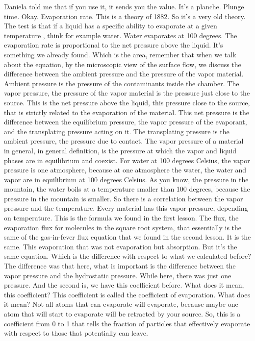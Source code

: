 Daniela told me that if you use it, it sends you the value. It's a planche. Plunge time. Okay. Evaporation rate. This is a theory of 1882. So it's a very old theory. The test is that if a liquid has a specific ability to evaporate at a given temperature , think for example water. Water evaporates at 100 degrees. The evaporation rate is proportional to the net pressure above the liquid. It's something we already found. Which is the area, remember that when we talk about the equation, by the microscopic view of the surface flow, we discuss the difference between the ambient pressure and the pressure of the vapor material. Ambient pressure is the pressure of the contaminants inside the chamber. The vapor pressure, the pressure of the vapor material is the pressure just close to the source. This is the net pressure above the liquid, this pressure close to the source, that is strictly related to the evaporation of the material. This net pressure is the difference between the equilibrium pressure, the vapor pressure of the evaporant, and the transplating pressure acting on it. The transplating pressure is the ambient pressure, the pressure due to contact. The vapor pressure of a material in general, in general definition, is the pressure at which the vapor and liquid phases are in equilibrium and coexist. For water at 100 degrees Celsius, the vapor pressure is one atmosphere, because at one atmosphere the water, the water and vapor are in equilibrium at 100 degrees Celsius. As you know, the pressure in the mountain, the water boils at a temperature smaller than 100 degrees, because the pressure in the mountain is smaller. So there is a correlation between the vapor pressure and the temperature. Every material has this vapor pressure, depending on temperature. This is the formula we found in the first lesson. The flux, the evaporation flux for molecules in the square root system, that essentially is the same of the gas-in-fever flux equation that we found in the second lesson. It is the same. This evaporation that was not evaporation but absorption. But it's the same equation. Which is the difference with respect to what we calculated before? The difference was that here, what is important is the difference between the vapor pressure and the hydrostatic pressure. While here, there was just one pressure. And the second is, we have this coefficient before. What does it mean, this coefficient? This coefficient is called the coefficient of evaporation. What does it mean? Not all atoms that can evaporate will evaporate, because maybe one atom that will start to evaporate will be retracted by your source. So, this is a coefficient from 0 to 1 that tells the fraction of particles that effectively evaporate with respect to those that potentially can leave.
